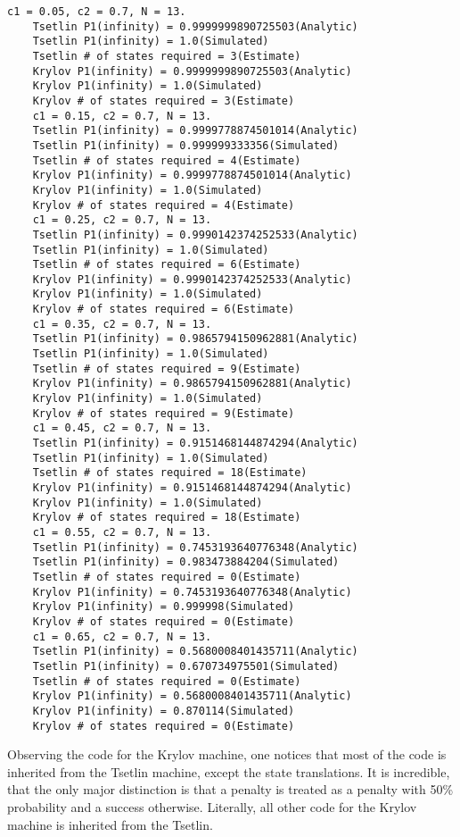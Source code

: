 \documentclass[10pt,english]{article}
\begin{document}
\begin{lstlisting}[label={list:first},caption=testbench output for the Krylov 2-action.] 
    c1 = 0.05, c2 = 0.7, N = 13.
    Tsetlin P1(infinity) = 0.9999999890725503(Analytic)
    Tsetlin P1(infinity) = 1.0(Simulated)
    Tsetlin # of states required = 3(Estimate)
    Krylov P1(infinity) = 0.9999999890725503(Analytic)
    Krylov P1(infinity) = 1.0(Simulated)
    Krylov # of states required = 3(Estimate)
    c1 = 0.15, c2 = 0.7, N = 13.
    Tsetlin P1(infinity) = 0.9999778874501014(Analytic)
    Tsetlin P1(infinity) = 0.999999333356(Simulated)
    Tsetlin # of states required = 4(Estimate)
    Krylov P1(infinity) = 0.9999778874501014(Analytic)
    Krylov P1(infinity) = 1.0(Simulated)
    Krylov # of states required = 4(Estimate)
    c1 = 0.25, c2 = 0.7, N = 13.
    Tsetlin P1(infinity) = 0.9990142374252533(Analytic)
    Tsetlin P1(infinity) = 1.0(Simulated)
    Tsetlin # of states required = 6(Estimate)
    Krylov P1(infinity) = 0.9990142374252533(Analytic)
    Krylov P1(infinity) = 1.0(Simulated)
    Krylov # of states required = 6(Estimate)
    c1 = 0.35, c2 = 0.7, N = 13.
    Tsetlin P1(infinity) = 0.9865794150962881(Analytic)
    Tsetlin P1(infinity) = 1.0(Simulated)
    Tsetlin # of states required = 9(Estimate)
    Krylov P1(infinity) = 0.9865794150962881(Analytic)
    Krylov P1(infinity) = 1.0(Simulated)
    Krylov # of states required = 9(Estimate)
    c1 = 0.45, c2 = 0.7, N = 13.
    Tsetlin P1(infinity) = 0.9151468144874294(Analytic)
    Tsetlin P1(infinity) = 1.0(Simulated)
    Tsetlin # of states required = 18(Estimate)
    Krylov P1(infinity) = 0.9151468144874294(Analytic)
    Krylov P1(infinity) = 1.0(Simulated)
    Krylov # of states required = 18(Estimate)
    c1 = 0.55, c2 = 0.7, N = 13.
    Tsetlin P1(infinity) = 0.7453193640776348(Analytic)
    Tsetlin P1(infinity) = 0.983473884204(Simulated)
    Tsetlin # of states required = 0(Estimate)
    Krylov P1(infinity) = 0.7453193640776348(Analytic)
    Krylov P1(infinity) = 0.999998(Simulated)
    Krylov # of states required = 0(Estimate)
    c1 = 0.65, c2 = 0.7, N = 13.
    Tsetlin P1(infinity) = 0.5680008401435711(Analytic)
    Tsetlin P1(infinity) = 0.670734975501(Simulated)
    Tsetlin # of states required = 0(Estimate)
    Krylov P1(infinity) = 0.5680008401435711(Analytic)
    Krylov P1(infinity) = 0.870114(Simulated)
    Krylov # of states required = 0(Estimate)
\end{lstlisting}
Observing the code for the Krylov machine, one notices that most of the code is inherited from the Tsetlin machine, except the state translations. It is incredible, that the only major distinction is that a penalty is treated as a penalty with 50\% probability and a success otherwise. Literally, all other code for the Krylov machine is inherited from the Tsetlin.
\end{document}
